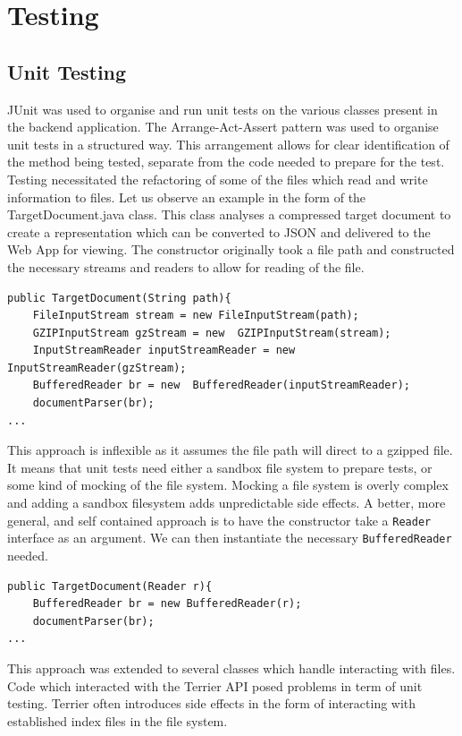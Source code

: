 \documentclass{l4proj}
\newcommand{\code}[1]{\texttt{#1}}
\begin{document}
\section{Testing} \label{testing}
\subsection{Unit Testing}
JUnit was used to organise and run unit tests on the various classes present in the backend application.
The Arrange-Act-Assert pattern was used to organise unit tests in a structured way. This arrangement allows for clear identification of the method being tested, separate from the code needed to prepare for the test.
Testing necessitated the refactoring of some of the files which read and write information to files. Let us observe an example in the form of the TargetDocument.java class. This class analyses a compressed target document to create a representation which can be converted to JSON and delivered to the Web App for viewing.
The constructor originally took a file path and constructed the necessary streams and readers to allow for reading of the file.
\begin{verbatim}
public TargetDocument(String path){
    FileInputStream stream = new FileInputStream(path);
    GZIPInputStream gzStream = new  GZIPInputStream(stream);
    InputStreamReader inputStreamReader = new  InputStreamReader(gzStream);
    BufferedReader br = new  BufferedReader(inputStreamReader);
    documentParser(br);
...
\end{verbatim}

This approach is inflexible as it assumes the file path will direct to a gzipped file. It means that unit tests need either a sandbox file system to prepare tests, or some kind of mocking of the file system. Mocking a file system is overly complex and adding a sandbox filesystem adds unpredictable side effects.
A better, more general, and self contained approach is to have the constructor take a \code{Reader} interface as an argument. We can then instantiate the necessary \code{BufferedReader} needed.

\begin{verbatim}
public TargetDocument(Reader r){
    BufferedReader br = new BufferedReader(r);
    documentParser(br);
...
\end{verbatim}

This approach was extended to several classes which handle interacting with files.
Code which interacted with the Terrier API posed problems in term of unit testing. Terrier often introduces side effects in the form of interacting with established index files in the file system.
\end{document}
